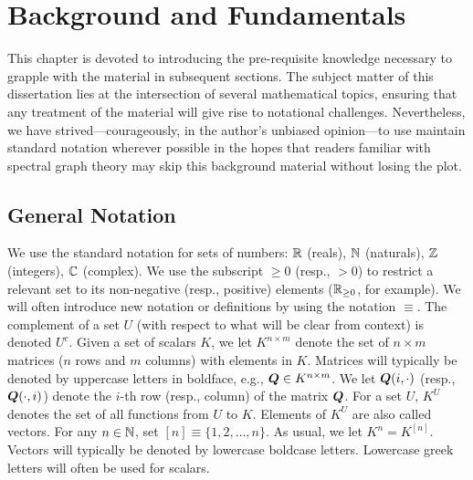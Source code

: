 \chapter{Background and Fundamentals}
\label{sec:background}
This chapter is devoted to introducing the  pre-requisite knowledge necessary to grapple with the material in subsequent sections. The subject matter of this dissertation lies at the intersection of several mathematical topics, ensuring that any treatment  of the material will give rise to notational challenges. Nevertheless, we have strived---courageously, in the author's unbiased opinion---to use maintain standard notation wherever possible in the hopes that readers familiar with spectral graph theory may skip this background material without losing the plot. 


\section{General Notation}
\label{sec:background_general}
We use the standard notation for sets of numbers: $\mathbb{R}$ (reals), $\mathbb{N}$ (naturals), $\mathbb{Z}$ (integers), $\mathbb{C}$ (complex).  We use the subscript $\geq 0$ (resp., $>0$) to restrict a relevant set to its non-negative (resp., positive) elements ($\mathbb{R}_{\geq 0}$, for example). 
We will often introduce new notation or definitions by using the notation $\equiv$. The complement of a set $U$ (with respect to what will be clear from context) is denoted $U^c$. 
Given a set of scalars $K$, we let $K^{n\times m}$ denote the set of $n\times m$ matrices ($n$ rows and $m$ columns) with elements in $K$. Matrices will typically be denoted by uppercase letters in boldface, e.g., $\vb*{Q}\in K^{n\times m}$. 
We let $\vb*{Q}(i,\cdot)$ (resp., $\vb*{Q}(\cdot,i)$) denote the $i$-th row (resp., column) of the matrix $\vb*{Q}$. 
For a set $U$, $K^U$ denotes the set of all functions from $U$ to $K$.  Elements of $K^U$ are also called vectors. For any $n\in\mathbb{N}$, set $[n]\equiv \{1,2,\dots,n\}$. As usual, we let $K^n=K^{[n]}$.  Vectors will typically be denoted by lowercase boldcase letters. Lowercase  greek letters will often be used for scalars. 

